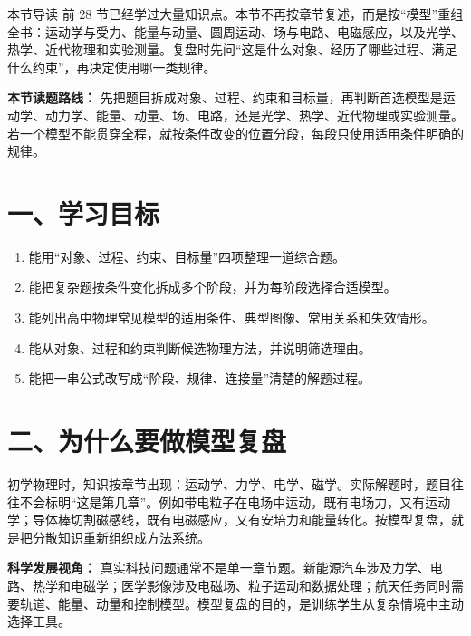 
\begin{learningbox}{本节导读}
前 28 节已经学过大量知识点。本节不再按章节复述，而是按“模型”重组全书：运动学与受力、能量与动量、圆周运动、场与电路、电磁感应，以及光学、热学、近代物理和实验测量。复盘时先问“这是什么对象、经历了哪些过程、满足什么约束”，再决定使用哪一类规律。
\end{learningbox}

\textbf{本节读题路线：} 先把题目拆成对象、过程、约束和目标量，再判断首选模型是运动学、动力学、能量、动量、场、电路，还是光学、热学、近代物理或实验测量。若一个模型不能贯穿全程，就按条件改变的位置分段，每段只使用适用条件明确的规律。

\section*{一、学习目标}
\begin{enumerate}
  \item 能用“对象、过程、约束、目标量”四项整理一道综合题。
  \item 能把复杂题按条件变化拆成多个阶段，并为每阶段选择合适模型。
  \item 能列出高中物理常见模型的适用条件、典型图像、常用关系和失效情形。
  \item 能从对象、过程和约束判断候选物理方法，并说明筛选理由。
  \item 能把一串公式改写成“阶段、规律、连接量”清楚的解题过程。
\end{enumerate}
\section*{二、为什么要做模型复盘}

初学物理时，知识按章节出现：运动学、力学、电学、磁学。实际解题时，题目往往不会标明“这是第几章”。例如带电粒子在电场中运动，既有电场力，又有运动学；导体棒切割磁感线，既有电磁感应，又有安培力和能量转化。按模型复盘，就是把分散知识重新组织成方法系统。

\textbf{科学发展视角：} 真实科技问题通常不是单一章节题。新能源汽车涉及力学、电路、热学和电磁学；医学影像涉及电磁场、粒子运动和数据处理；航天任务同时需要轨道、能量、动量和控制模型。模型复盘的目的，是训练学生从复杂情境中主动选择工具。

\begin{center}


\label{fig:physics-model-map}
\end{center}

